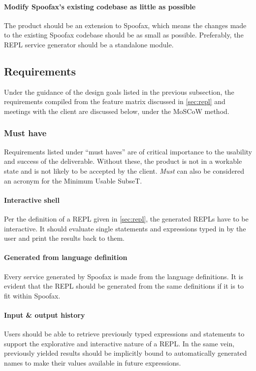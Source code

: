 \paragraph{Modify Spoofax's existing codebase as little as possible} The product
should be an extension to Spoofax, which means the changes made to the existing
Spoofax codebase should be as small as possible. Preferably, the REPL service
generator should be a standalone module.

\subsection{Requirements}
\label{ssec:requirements}

Under the guidance of the design goals listed in the previous subsection, the
requirements compiled from the feature matrix discussed in \cref{sec:repl} and
meetings with the client are discussed below, under the MoSCoW method.

\subsubsection{Must have}

Requirements listed under ``must haves'' are of critical importance to the
usability and success of the deliverable. Without these, the product is not in a
workable state and is not likely to be accepted by the client. \textit{Must} can
also be considered an acronym for the Minimum Usable SubseT.

\paragraph{Interactive shell} Per the definition of a REPL given in
\cref{sec:repl}, the generated REPLs have to be interactive. It should evaluate
single statements and expressions typed in by the user and print the results
back to them.

\paragraph{Generated from language definition} Every service generated by
Spoofax is made from the language definitions. It is evident that the REPL
should be generated from the same definitions if it is to fit within Spoofax.

\paragraph{Input \& output history} Users should be able to retrieve previously
typed expressions and statements to support the explorative and interactive
nature of a REPL. In the same vein, previously yielded results should be
implicitly bound to automatically generated names to make their values available
in future expressions.

